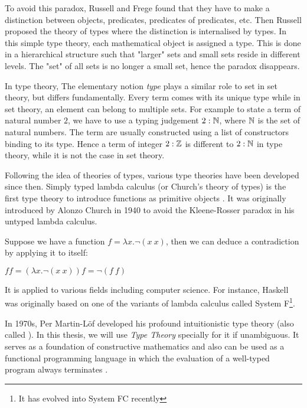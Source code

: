 To avoid this paradox, Russell and Frege found that they have to make a distinction between objects, predicates, predicates of predicates, etc. Then Russell proposed the theory of types \cite{rus:1903} where the distinction is internalised by types.
In this simple type theory, each mathematical object is assigned a type. This is done in a hierarchical structure such that "larger" sets and small sets reside in different levels. The "set" of all
sets is no longer a small set, hence the
paradox disappears.

In type theory, The elementary notion \emph{type} plays a similar role to set in set theory, but differs fundamentally. Every term comes with its unique type while in set theory, an element can belong to multiple sets.
For example to state a term of natural number $2$, we have to use a typing judgement $2:\mathbb{N}$, where $\mathbb{N}$ is the set of natural numbers. The term are usually constructed using a list of constructors binding to its type. Hence a term of integer $2 : \mathbb{Z}$ is different to $2:\mathbb{N}$ in type theory, while it is not the case in set theory.

Following the idea of theories of types, various type theories have been developed since then. 
Simply typed lambda calculus (or Church's theory of types) is the first type theory to introduce functions as primitive objects \cite{sep-type-theory}. It was originally introduced by Alonzo Church in 1940 to avoid the Kleene-Rosser paradox \cite{kleene1935inconsistency} in his untyped lambda calculus.

\begin{example}
Suppose we have a function $f = \lambda x . \neg (x ~ x) $, then we can deduce a contradiction by applying it to itself:

$f f = (\lambda x . \neg (x ~ x)) f = \neg (f ~ f)$
\end{example}

It is applied to various fields including computer science. For instance, Haskell was originally based on one of the variants of lambda calculus called System F\footnote{It has evolved into System FC recently}. 



In 1970s, Per Martin-L\"{o}f \cite{per:71,per:82} developed his profound intuitionistic type theory (also called \mltt). In this thesis, we will use \emph{Type Theory} specially for it if unambiguous.
It serves as a foundation of constructive mathematics \cite{martin1984intuitionistic} and also can be used as a functional programming language \cite{DBLP:dblp_journals/tcs/Troelstra99} in
which the evaluation of a well-typed program always terminates \cite{nor:90}. 


